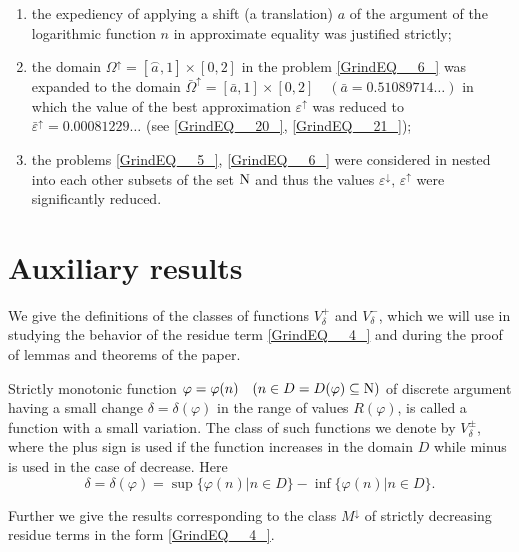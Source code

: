 \documentclass[
11pt,%
tightenlines,%
twoside,%
onecolumn,%
nofloats,%
nobibnotes,%
nofootinbib,%
superscriptaddress,%
noshowpacs,%
centertags]%
{revtex4}
\begin{document}
\begin{enumerate}
	\item the expediency of applying a shift (a translation) $a$ of the argument of the logarithmic function $n$ in approximate equality was justified strictly;
	
	\item the domain $ \Omega ^{\uparrow }  =[\stackrel{\frown}{a},   1] \times [0,  2] $ in the problem \eqref{GrindEQ__6_} was expanded to the domain $\bar{\Omega }^{\uparrow }  =[\bar{a},   1] \times [0,  2]  \quad     (  \bar{a}=  0.51089714\dots)$ in which the value of the best approximation $\varepsilon ^{\uparrow } $ was reduced to $\bar{\varepsilon }^{\uparrow }  =  0.00081229\dots $ (see \eqref{GrindEQ__20_}, \eqref{GrindEQ__21_});
	
	\item the problems \eqref{GrindEQ__5_}, \eqref{GrindEQ__6_} were considered in nested into each other subsets of the set ${\rm N} $ and thus the values $\varepsilon ^{\downarrow }  ,  \,    \varepsilon ^{\uparrow } $ were significantly reduced.
	
\end{enumerate}



\section{Auxiliary results}

We give the definitions of the classes of functions $V_{\delta}^{+} $ and $V_{\delta}^{-} $, which we will use in studying the behavior of the residue term \eqref{GrindEQ__4_} and during the proof of lemmas and theorems of the paper.


\begin{definition}
	Strictly monotonic function $\varphi =\varphi (n)\quad (n\in D=D(\varphi )\subseteq {\rm N} )$ of discrete argument having a small change $\delta=\delta(\varphi)$ in the range of values $R(\varphi)$, is called a function with a small variation. The class of such functions we denote by $V_{\delta}^{\pm } $, where the plus sign is used if the function increases in the domain $D$ while minus is used in the case of decrease. Here
	$$\delta = \delta (\varphi )= \sup \{ \varphi (n)\left| n\in D\}  -\right.  \inf \{ \varphi (n)\left| n\in D\}.\right.$$
\end{definition}

Further we give the results corresponding to the class $M^{\downarrow } $ of strictly decreasing residue terms in the form \eqref{GrindEQ__4_}.
\end{document}
